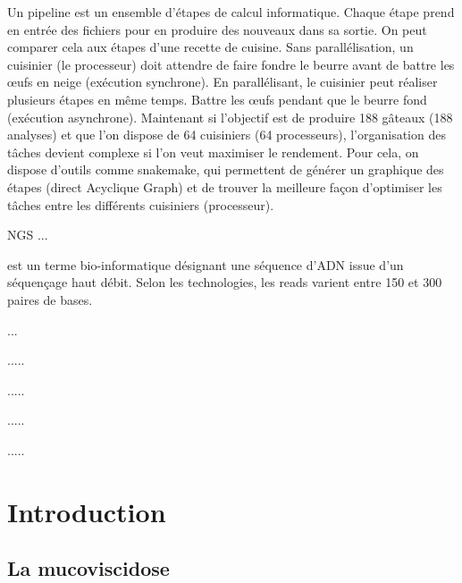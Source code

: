 \documentclass[12pt,a4paper]{article}
\begin{document}
\begin{description}
\item[Pipeline] 
Un pipeline est un ensemble d'étapes de calcul informatique. Chaque étape prend en entrée des fichiers pour en produire des nouveaux dans sa sortie. On peut comparer cela aux étapes d'une recette de cuisine. Sans parallélisation, un cuisinier (le processeur) doit attendre de faire fondre le beurre avant de battre les œufs en neige (exécution synchrone). En parallélisant, le cuisinier peut réaliser plusieurs étapes en même temps. Battre les œufs pendant que le beurre fond (exécution asynchrone). 
Maintenant si l'objectif est de produire 188 gâteaux (188 analyses) et que l'on dispose de 64 cuisiniers (64 processeurs), l'organisation des tâches devient complexe si l'on veut maximiser le rendement. Pour cela, on dispose d'outils comme snakemake, qui permettent de générer un graphique des étapes (direct Acyclique Graph) et de trouver la meilleure façon d'optimiser les tâches entre les différents cuisiniers (processeur). 

\item{NGS} ... 

\item[Un read] est un terme bio-informatique désignant une séquence d’ADN issue d’un séquençage haut débit. Selon les technologies, les reads varient entre 150 et 300 paires de bases.

\item[librarie] ... 

\item[Un fichier fastq] .....

\item[Un fichier fasta] .....

\item[Un fichier biom] .....

\item[R] .....


\end{description}

\newpage

\setcounter{page}{1}

\section{Introduction}
\subsection{La mucoviscidose}
\end{document}
